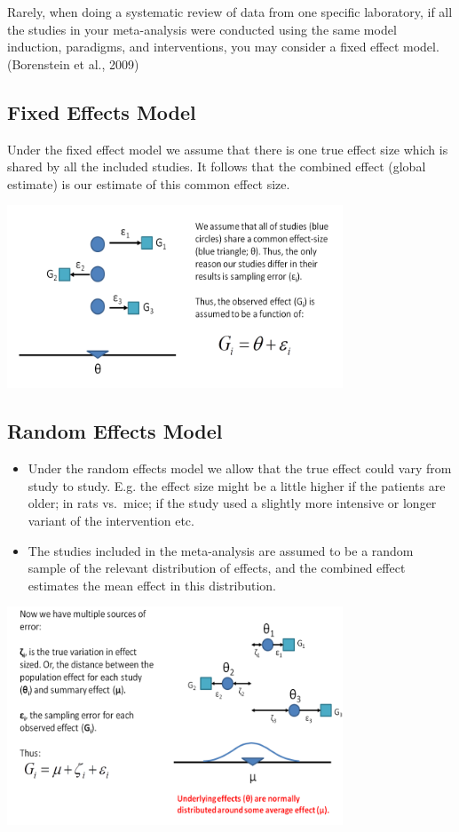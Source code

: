\documentclass[
]{book}
\begin{document}
Rarely, when doing a systematic review of data from one specific laboratory, if all the studies in your meta-analysis were conducted using the same model induction, paradigms, and interventions, you may consider a fixed effect model. (Borenstein et al., 2009)

\hypertarget{fixed-effects-model}{%
\subsection{Fixed Effects Model}\label{fixed-effects-model}}

Under the fixed effect model we assume that there is one true effect size which is shared by all the included studies. It follows that the combined effect (global estimate) is our estimate of this common effect size.

\includegraphics[width=0.75\textwidth,height=\textheight]{figs/fixedeffects.png}

\hypertarget{random-effects-model}{%
\subsection{Random Effects Model}\label{random-effects-model}}

\begin{itemize}
\item
  Under the random effects model we allow that the true effect could vary from study to study. E.g. the effect size might be a little higher if the patients are older; in rats vs.~mice; if the study used a slightly more intensive or longer variant of the intervention etc.
\item
  The studies included in the meta-analysis are assumed to be a random sample of the relevant distribution of effects, and the combined effect estimates the mean effect in this distribution.
\end{itemize}

\includegraphics[width=0.75\textwidth,height=\textheight]{figs/randomeffects.png}
\end{document}
